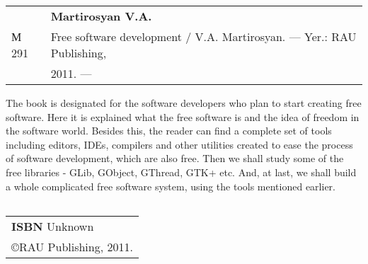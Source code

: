 \newpage
\thispagestyle{empty}

\begin{tabular}{l}
\end{tabular}

\vskip 70pt

\begin{tabular}{ll}
 & {\bf Martirosyan V.A.} \\
М 291 & Free software development / V.A. Martirosyan. --- Yer.: RAU Publishing, \\
 & 2011. ---
\end{tabular}

\vskip 70pt

{\small
The book is designated for the software developers who plan to start creating free software. Here it is explained what the free software is and the idea of freedom in the software world. Besides this, the reader can find a complete set of tools including editors, IDEs, compilers and other utilities created to ease the process of software development, which are also free. Then we shall study some of the free libraries - GLib, GObject, GThread, GTK+ etc.
And, at last, we shall build a whole complicated free software system, using the tools mentioned earlier.
}
\vskip 100pt


\hskip 250pt
\begin{tabular}{l}
\end{tabular}

\vskip 100pt


\begin{tabular}{l}
{\bf ISBN } Unknown  \\
\copyright RAU Publishing, 2011.
\end{tabular}
